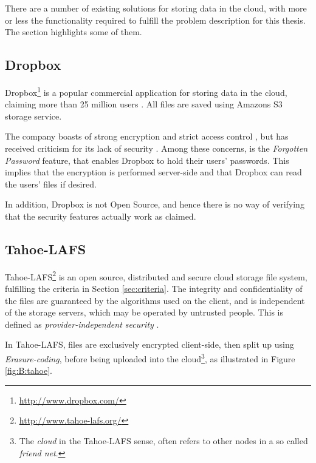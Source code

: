 \documentclass[pdftex,english,10pt,b5paper,twoside]{book}
\begin{document}
There are a number of existing solutions for storing data in the cloud,
with more or less the functionality required to fulfill the problem
description for this thesis. The section highlights some of them.

\subsection{Dropbox}

Dropbox\footnote{\url{http://www.dropbox.com/}} is a popular commercial
application for storing data in the cloud, claiming more than 25 million users
\cite{dropbox_users}. All files are saved using Amazons S3 storage service.

The company boasts of strong encryption and strict access control
\cite{dropbox_security}, but has received criticism for its lack of security
\cite{dropbox_concerns}. Among these concerns, is the \emph{Forgotten Password}
feature, that enables Dropbox to hold their users' passwords. This
implies that the encryption is performed server-side and that Dropbox can read
the users' files if desired.

In addition, Dropbox is not Open Source, and hence there is no way of verifying
that the security features actually work as claimed.

\subsection{Tahoe-LAFS}
\label{sec:tahoe}

Tahoe-\ac{LAFS}\footnote{\url{http://www.tahoe-lafs.org/}} is an open source,
distributed and secure cloud storage file system, fulfilling the criteria in
Section \ref{sec:criteria}. The integrity and confidentiality of the
files are guaranteed by the algorithms used on the client, and is independent
of the storage servers, which may be operated by untrusted people.
This is defined as \emph{provider-independent security} \cite{tahoe}.

In Tahoe-\ac{LAFS}, files are exclusively encrypted client-side, then split up
using \emph{Erasure-coding}, before being uploaded into the cloud\footnote{The
\emph{cloud} in the Tahoe-\ac{LAFS} sense, often refers to other nodes in a so
called \emph{friend net}.}, as illustrated in Figure \ref{fig:B:tahoe}.
\end{document}
